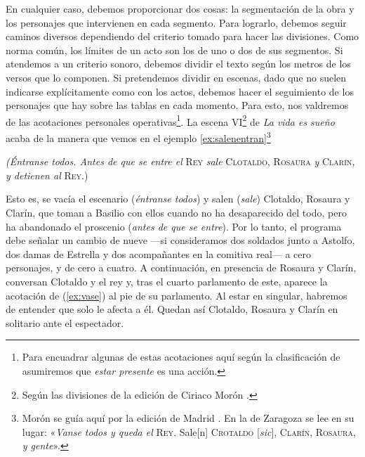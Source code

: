 En cualquier caso, debemos proporcionar dos cosas: la segmentación de la obra y los personajes que intervienen en cada segmento. Para lograrlo, debemos seguir caminos diversos dependiendo del criterio tomado para hacer las divisiones. Como norma común, los límites de un acto son los de uno o dos de sus segmentos. Si atendemos a un criterio sonoro, debemos dividir el texto según los metros de los versos que lo componen. Si pretendemos dividir en escenas, dado que no suelen indicarse explícitamente como con los actos, debemos hacer el seguimiento de los personajes que hay sobre las tablas en cada momento. Para esto, nos valdremos de las acotaciones personales operativas\footnote{Para encuadrar algunas de estas acotaciones aquí según la clasificación de \citeauthor{garcia2020}~\parencite*[76-79]{garcia2020} asumiremos que \textit{estar presente} es una acción.}.  La escena VI\footnote{Según las divisiones de la edición de Ciriaco Morón \parencite{calderon_lavidaessuenno}.} de \textit{La vida es sueño}\nocite{calderon_lavidaessuenno} acaba de la manera que vemos en el ejemplo \ref{ex:salenentran}\footnote{Morón se guía aquí por la edición de Madrid \parencite{calderon_madrid}. En la de Zaragoza \parencite{calderon_zaragoza} se lee en su lugar: «\textit{Vanse todos y queda el} \textsc{Rey}. Sale[n] \textsc{Crotaldo} [\emph{sic}], \textsc{Clarín},  \textsc{Rosaura}, \textit{y gente}».}

\begin{exe}
	\ex\label{ex:salenentran}\textit{(Éntranse todos. Antes de que se entre el} \textsc{Rey} \textit{sale} \textsc{Clotaldo}, \textsc{Rosaura} \textit{y} \textsc{Clarín}\textit{, y detienen al} \textsc{Rey}.)
\end{exe}

Esto es, se vacía el escenario (\textit{éntranse todos}) y salen (\textit{sale}) Clotaldo, Rosaura y Clarín, que toman a Basilio con ellos cuando no ha desaparecido del todo, pero ha abandonado el proscenio (\textit{antes de que se entre}). Por lo tanto, el programa debe señalar un cambio de nueve —\nolinebreak si consideramos dos soldados junto a Astolfo, dos damas de Estrella y dos acompañantes en la comitiva real\nolinebreak— a cero personajes, y de cero a cuatro. A continuación, en presencia de Rosaura y Clarín, conversan Clotaldo y el rey y, tras el cuarto parlamento de este, aparece la acotación de (\ref{ex:vase}) al pie de su parlamento. Al estar en singular, habremos de entender que solo le afecta a él. Quedan así  Clotaldo, Rosaura y Clarín en solitario ante el espectador.


